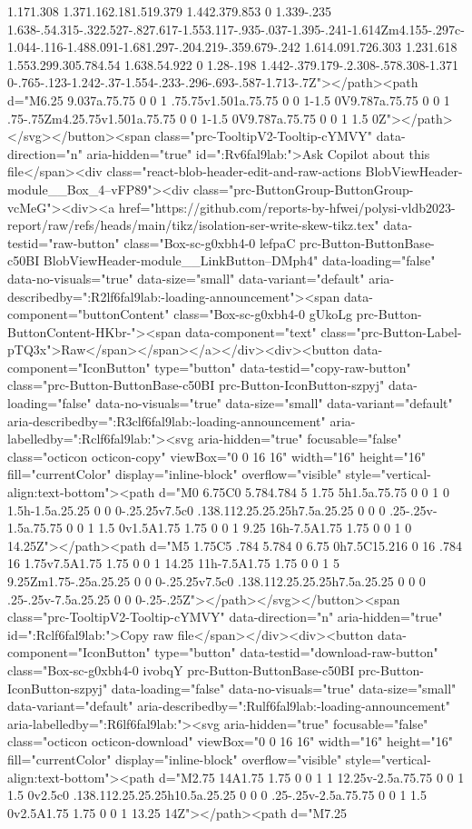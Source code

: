 {{{{{{{{{{{{{{{{{{{{{{{{{{{{{1.171.308 1.371.162.181.519.379 1.442.379.853 0 1.339-.235 1.638-.54.315-.322.527-.827.617-1.553.117-.935-.037-1.395-.241-1.614Zm4.155-.297c-1.044-.116-1.488.091-1.681.297-.204.219-.359.679-.242 1.614.091.726.303 1.231.618 1.553.299.305.784.54 1.638.54.922 0 1.28-.198 1.442-.379.179-.2.308-.578.308-1.371 0-.765-.123-1.242-.37-1.554-.233-.296-.693-.587-1.713-.7Z"></path><path d="M6.25 9.037a.75.75 0 0 1 .75.75v1.501a.75.75 0 0 1-1.5 0V9.787a.75.75 0 0 1 .75-.75Zm4.25.75v1.501a.75.75 0 0 1-1.5 0V9.787a.75.75 0 0 1 1.5 0Z"></path></svg></button><span class="prc-TooltipV2-Tooltip-cYMVY" data-direction="n" aria-hidden="true" id=":Rv6fal9lab:">Ask Copilot about this file</span><div class="react-blob-header-edit-and-raw-actions BlobViewHeader-module__Box_4--vFP89"><div class="prc-ButtonGroup-ButtonGroup-vcMeG"><div><a href="https://github.com/reports-by-hfwei/polysi-vldb2023-report/raw/refs/heads/main/tikz/isolation-ser-write-skew-tikz.tex" data-testid="raw-button" class="Box-sc-g0xbh4-0 lefpaC prc-Button-ButtonBase-c50BI BlobViewHeader-module__LinkButton--DMph4" data-loading="false" data-no-visuals="true" data-size="small" data-variant="default" aria-describedby=":R2lf6fal9lab:-loading-announcement"><span data-component="buttonContent" class="Box-sc-g0xbh4-0 gUkoLg prc-Button-ButtonContent-HKbr-"><span data-component="text" class="prc-Button-Label-pTQ3x">Raw</span></span></a></div><div><button data-component="IconButton" type="button" data-testid="copy-raw-button" class="prc-Button-ButtonBase-c50BI prc-Button-IconButton-szpyj" data-loading="false" data-no-visuals="true" data-size="small" data-variant="default" aria-describedby=":R3clf6fal9lab:-loading-announcement" aria-labelledby=":Rclf6fal9lab:"><svg aria-hidden="true" focusable="false" class="octicon octicon-copy" viewBox="0 0 16 16" width="16" height="16" fill="currentColor" display="inline-block" overflow="visible" style="vertical-align:text-bottom"><path d="M0 6.75C0 5.784.784 5 1.75 5h1.5a.75.75 0 0 1 0 1.5h-1.5a.25.25 0 0 0-.25.25v7.5c0 .138.112.25.25.25h7.5a.25.25 0 0 0 .25-.25v-1.5a.75.75 0 0 1 1.5 0v1.5A1.75 1.75 0 0 1 9.25 16h-7.5A1.75 1.75 0 0 1 0 14.25Z"></path><path d="M5 1.75C5 .784 5.784 0 6.75 0h7.5C15.216 0 16 .784 16 1.75v7.5A1.75 1.75 0 0 1 14.25 11h-7.5A1.75 1.75 0 0 1 5 9.25Zm1.75-.25a.25.25 0 0 0-.25.25v7.5c0 .138.112.25.25.25h7.5a.25.25 0 0 0 .25-.25v-7.5a.25.25 0 0 0-.25-.25Z"></path></svg></button><span class="prc-TooltipV2-Tooltip-cYMVY" data-direction="n" aria-hidden="true" id=":Rclf6fal9lab:">Copy raw file</span></div><div><button data-component="IconButton" type="button" data-testid="download-raw-button" class="Box-sc-g0xbh4-0 ivobqY prc-Button-ButtonBase-c50BI prc-Button-IconButton-szpyj" data-loading="false" data-no-visuals="true" data-size="small" data-variant="default" aria-describedby=":Rulf6fal9lab:-loading-announcement" aria-labelledby=":R6lf6fal9lab:"><svg aria-hidden="true" focusable="false" class="octicon octicon-download" viewBox="0 0 16 16" width="16" height="16" fill="currentColor" display="inline-block" overflow="visible" style="vertical-align:text-bottom"><path d="M2.75 14A1.75 1.75 0 0 1 1 12.25v-2.5a.75.75 0 0 1 1.5 0v2.5c0 .138.112.25.25.25h10.5a.25.25 0 0 0 .25-.25v-2.5a.75.75 0 0 1 1.5 0v2.5A1.75 1.75 0 0 1 13.25 14Z"></path><path d="M7.25 }}}}}}}}}}}}}}}}}}}}}}}}}}}}}

